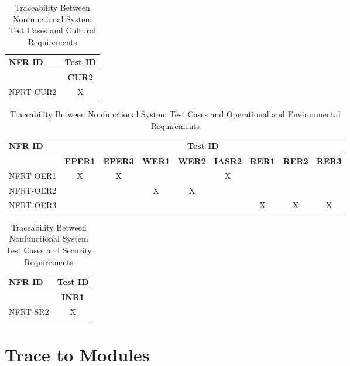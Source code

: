 \documentclass[12pt, titlepage]{article}
\begin{document}
\begin{landscape}
  \begin{longtable}{|l|c|}
		\caption{Traceability Between Nonfunctional System Test Cases and Cultural Requirements} \\
		\hline
    \textbf{NFR ID}   & \multicolumn{1}{c|}{\textbf{Test ID}} \\
    \hline
    ~ & \textbf{CUR2} \\
    \hline
    NFRT-CUR2 & X \\
    \hline
  \end{longtable}

  \begin{longtable}{|l|cccccccc|}
		\caption{Traceability Between Nonfunctional System Test Cases and Operational and Environmental Requirements} \\
		\hline
    \textbf{NFR ID}   & \multicolumn{8}{c|}{\textbf{Test ID}} \\
    \hline
    ~ & \textbf{EPER1} & \textbf{EPER3} & \textbf{WER1} & \textbf{WER2} & \textbf{IASR2} & \textbf{RER1} & \textbf{RER2} & \textbf{RER3} \\
    \hline
    NFRT-OER1 & X & X & ~ & ~ & X & ~ & ~ & ~ \\
    NFRT-OER2 & ~ & ~ & X & X & ~ & ~ & ~ & ~ \\
    NFRT-OER3 & ~ & ~ & ~ & ~ & ~ & X & X & X \\
    \hline
  \end{longtable}

  \begin{longtable}{|l|c|}
		\caption{Traceability Between Nonfunctional System Test Cases and Security Requirements} \\
		\hline
    \textbf{NFR ID}   & \multicolumn{1}{c|}{\textbf{Test ID}} \\
    \hline
    ~ & \textbf{INR1} \\
    \hline
    NFRT-SR2 & X \\
    \hline
  \end{longtable}
\end{landscape}
		
\section{Trace to Modules}
\end{document}
